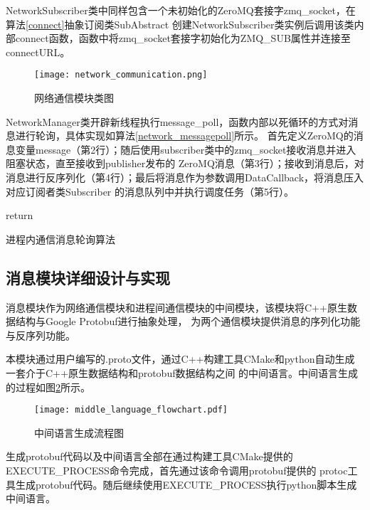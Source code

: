 NetworkSubscriber类中同样包含一个未初始化的ZeroMQ套接字zmq\_socket，在算法\ref{connect}抽象订阅类SubAbstract
创建NetworkSubscriber类实例后调用该类内部connect函数，函数中将zmq\_socket套接字初始化为ZMQ\_SUB属性并连接至connectURL。
\begin{figure}[H]
  \centering
  \texttt{[image: network\_communication.png]}
  \caption{网络通信模块类图}
  \label{network_communication}
\end{figure}
NetworkManager类开辟新线程执行message\_poll，函数内部以死循环的方式对消息进行轮询，具体实现如算法\ref{network_messagepoll}所示。
首先定义ZeroMQ的消息变量message（第2行）；随后使用subscriber类中的zmq\_socket接收消息并进入阻塞状态，直至接收到publisher发布的
ZeroMQ消息（第3行）；接收到消息后，对消息进行反序列化（第4行）；最后将消息作为参数调用DataCallback，将消息压入对应订阅者类Subscriber
的消息队列中并执行调度任务（第5行）。
\begin{algorithm}
  \small
  \SetAlgoLined
  return 
  \caption{进程内通信消息轮询算法}
  \label{network_messagepoll}
\end{algorithm}

\subsection{消息模块详细设计与实现}
消息模块作为网络通信模块和进程间通信模块的中间模块，该模块将C++原生数据结构与Google Protobuf进行抽象处理，
为两个通信模块提供消息的序列化功能与反序列功能。

本模块通过用户编写的.proto文件，通过C++构建工具CMake和python自动生成一套介于C++原生数据结构和protobuf数据结构之间
的中间语言。中间语言生成的过程如图\ref{middle_language_flowchart}所示。
\begin{figure}[H]
  \centering
  \texttt{[image: middle\_language\_flowchart.pdf]}
  \caption{中间语言生成流程图}
  \label{middle_language_flowchart}
\end{figure}
生成protobuf代码以及中间语言全部在通过构建工具CMake提供的EXECUTE\_PROCESS命令完成，首先通过该命令调用protobuf提供的
protoc工具生成protobuf代码。随后继续使用EXECUTE\_PROCESS执行python脚本生成中间语言。

